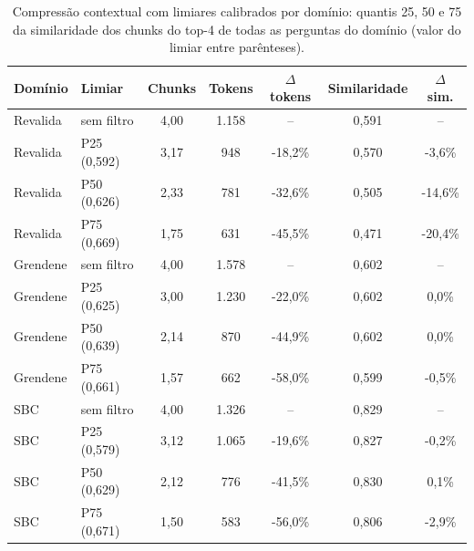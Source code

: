 \begin{table}[!t]
\centering
\footnotesize
\setlength{\tabcolsep}{4pt}
\caption{Compressão contextual com limiares calibrados por domínio: quantis 25, 50 e 75 da similaridade dos chunks do top-4 de todas as perguntas do domínio (valor do limiar entre parênteses).}
\label{tab:compressao_calibrada}
\begin{tabular}{llccccc}
\toprule
Domínio & Limiar & Chunks & Tokens & $\Delta$ tokens & Similaridade & $\Delta$ sim. \\
\midrule
Revalida & sem filtro & 4,00 & 1.158 & -- & 0,591 & -- \\
Revalida & P25 (0,592) & 3,17 & 948 & -18,2\% & 0,570 & -3,6\% \\
Revalida & P50 (0,626) & 2,33 & 781 & -32,6\% & 0,505 & -14,6\% \\
Revalida & P75 (0,669) & 1,75 & 631 & -45,5\% & 0,471 & -20,4\% \\
Grendene & sem filtro & 4,00 & 1.578 & -- & 0,602 & -- \\
Grendene & P25 (0,625) & 3,00 & 1.230 & -22,0\% & 0,602 & 0,0\% \\
Grendene & P50 (0,639) & 2,14 & 870 & -44,9\% & 0,602 & 0,0\% \\
Grendene & P75 (0,661) & 1,57 & 662 & -58,0\% & 0,599 & -0,5\% \\
SBC & sem filtro & 4,00 & 1.326 & -- & 0,829 & -- \\
SBC & P25 (0,579) & 3,12 & 1.065 & -19,6\% & 0,827 & -0,2\% \\
SBC & P50 (0,629) & 2,12 & 776 & -41,5\% & 0,830 & 0,1\% \\
SBC & P75 (0,671) & 1,50 & 583 & -56,0\% & 0,806 & -2,9\% \\
\bottomrule
\end{tabular}
\end{table}
